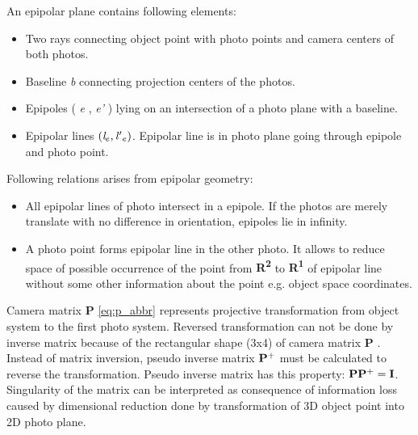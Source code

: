 \documentclass[a4paper,12pt]{article}
\newcommand{\ematr}[1]{
{\bf #1}
}
\newcommand{\escal}[1]{
{\it #1}
}
\newcommand{\eucl}[1]{
{\bf R\textsuperscript{#1}}
}
\begin{document}
An epipolar plane contains following elements:


\begin{itemize}
\item Two rays connecting object point with photo points and camera centers of both photos.
\item Baseline \escal{b} connecting projection centers of the photos.
\item Epipoles (\escal{e}, \escal{e'}) lying on an intersection of a photo plane with a baseline.
\item Epipolar lines  $(\escal{l}_{e}, \escal{l'}_{e})$. Epipolar line is in photo plane going through epipole and photo point.
\end{itemize}


\noindent Following relations arises from epipolar geometry:
\begin{itemize}
\item All epipolar lines of  photo intersect in a epipole. If the photos are merely translate with no difference in orientation, 
 epipoles lie in infinity.
\item A photo point forms epipolar line in the other photo. It allows to reduce space of possible occurrence of the point 
      from \eucl{2} to \eucl{1} of epipolar line without some other information about the point e.g. object space coordinates. 
\end{itemize}



Camera matrix \ematr{P} \eqref{eq:p_abbr} represents projective transformation from object system to the first photo system.
Reversed transformation can not be done by inverse matrix because of the rectangular shape (3x4) of 
camera matrix \ematr{P}. Instead of matrix inversion,  pseudo inverse matrix $\ematr{P}^{+}$ must be 
calculated to reverse the transformation. Pseudo inverse matrix has this property: $\ematr{P}\ematr{P}^{+} = \ematr{I}$.
Singularity of the matrix can be interpreted as consequence of information loss caused 
by dimensional reduction done by transformation of 3D object point into 2D photo plane.  
\end{document}
